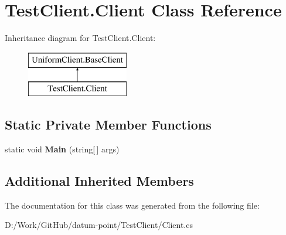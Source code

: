 \hypertarget{class_test_client_1_1_client}{}\section{Test\+Client.\+Client Class Reference}
\label{class_test_client_1_1_client}
Inheritance diagram for Test\+Client.\+Client\+:\begin{figure}[H]
\begin{center}
\leavevmode
\includegraphics[height=2.000000cm]{d6/dac/class_test_client_1_1_client}
\end{center}
\end{figure}
\subsection*{Static Private Member Functions}
\begin{DoxyCompactItemize}
\item 
\mbox{\label{class_test_client_1_1_client_a236c6c2776f2ec6851c36a8714ef6e03}} 
static void {\bfseries Main} (string\mbox{[}$\,$\mbox{]} args)
\end{DoxyCompactItemize}
\subsection*{Additional Inherited Members}


The documentation for this class was generated from the following file\+:\begin{DoxyCompactItemize}
\item 
D\+:/\+Work/\+Git\+Hub/datum-\/point/\+Test\+Client/Client.\+cs\end{DoxyCompactItemize}
